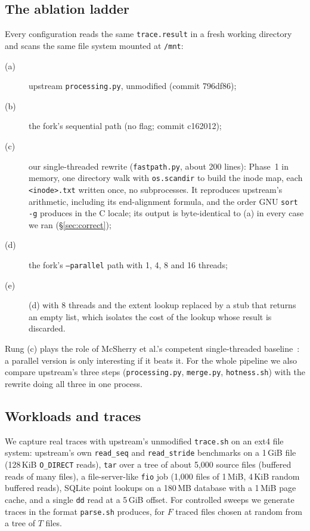 \subsection{The ablation ladder}
Every configuration reads the same \texttt{trace.result} in a fresh working
directory and scans the same file system mounted at \texttt{/mnt}:
\begin{description}
\item[(a)] upstream \texttt{processing.py}, unmodified (commit 796df86);
\item[(b)] the fork's sequential path (no flag; commit c162012);
\item[(c)] our single-threaded rewrite (\texttt{fastpath.py}, about 200 lines):
  Phase~1 in memory, one directory walk with \texttt{os.scandir} to build the
  inode map, each \texttt{<inode>.txt} written once, no subprocesses. It reproduces
  upstream's arithmetic, including its end-alignment formula, and the order GNU
  \texttt{sort -g} produces in the C locale; its output is byte-identical to (a) in
  every case we ran (\S\ref{sec:correct});
\item[(d)] the fork's \texttt{--parallel} path with 1, 4, 8 and 16 threads;
\item[(e)] (d) with 8 threads and the extent lookup replaced by a stub that returns
  an empty list, which isolates the cost of the lookup whose result is discarded.
\end{description}
Rung (c) plays the role of McSherry et al.'s competent single-threaded
baseline~\cite{mcsherry2015cost}: a parallel version is only interesting if it beats
it. For the whole pipeline we also compare upstream's three steps
(\texttt{processing.py}, \texttt{merge.py}, \texttt{hotness.sh}) with the rewrite
doing all three in one process.

\subsection{Workloads and traces}
We capture real traces with upstream's unmodified \texttt{trace.sh} on an ext4 file
system: upstream's own \texttt{read\_seq} and \texttt{read\_stride} benchmarks on a
1\,GiB file (128\,KiB \texttt{O\_DIRECT} reads), \texttt{tar} over a tree of about
5{,}000 source files (buffered reads of many files), a file-server-like
\texttt{fio} job (1{,}000 files of 1\,MiB, 4\,KiB random buffered reads), SQLite
point lookups on a 180\,MB database with a 1\,MiB page cache, and a single
\texttt{dd} read at a 5\,GiB offset. For controlled sweeps we generate traces in the
format \texttt{parse.sh} produces, for $F$ traced files chosen at random from a tree
of $T$ files.

